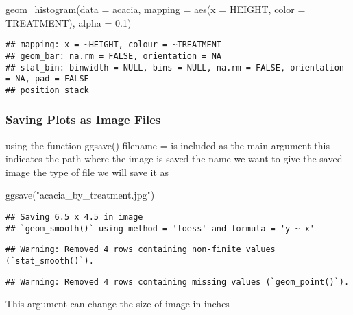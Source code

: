 \documentclass[
]{article}
\newenvironment{Shaded}{\begin{snugshade}}{\end{snugshade}}
\newcommand{\AttributeTok}[1]{\textcolor[rgb]{0.77,0.63,0.00}{#1}}
\newcommand{\FloatTok}[1]{\textcolor[rgb]{0.00,0.00,0.81}{#1}}
\newcommand{\FunctionTok}[1]{\textcolor[rgb]{0.00,0.00,0.00}{#1}}
\newcommand{\NormalTok}[1]{#1}
\newcommand{\StringTok}[1]{\textcolor[rgb]{0.31,0.60,0.02}{#1}}
\begin{document}
\begin{Shaded}
\begin{Highlighting}[]
\FunctionTok{geom\_histogram}\NormalTok{(}\AttributeTok{data =}\NormalTok{ acacia,}
               \AttributeTok{mapping =} \FunctionTok{aes}\NormalTok{(}\AttributeTok{x =}\NormalTok{ HEIGHT, }\AttributeTok{color =}\NormalTok{ TREATMENT), }
               \AttributeTok{alpha =} \FloatTok{0.1}\NormalTok{)}
\end{Highlighting}
\end{Shaded}

\begin{verbatim}
## mapping: x = ~HEIGHT, colour = ~TREATMENT 
## geom_bar: na.rm = FALSE, orientation = NA
## stat_bin: binwidth = NULL, bins = NULL, na.rm = FALSE, orientation = NA, pad = FALSE
## position_stack
\end{verbatim}

\hypertarget{saving-plots-as-image-files}{%
\subsubsection{Saving Plots as Image
Files}\label{saving-plots-as-image-files}}

using the function ggsave() filename = is included as the main argument
this indicates the path where the image is saved the name we want to
give the saved image the type of file we will save it as

\begin{Shaded}
\begin{Highlighting}[]
\FunctionTok{ggsave}\NormalTok{(}\StringTok{"acacia\_by\_treatment.jpg"}\NormalTok{)}
\end{Highlighting}
\end{Shaded}

\begin{verbatim}
## Saving 6.5 x 4.5 in image
## `geom_smooth()` using method = 'loess' and formula = 'y ~ x'
\end{verbatim}

\begin{verbatim}
## Warning: Removed 4 rows containing non-finite values (`stat_smooth()`).
\end{verbatim}

\begin{verbatim}
## Warning: Removed 4 rows containing missing values (`geom_point()`).
\end{verbatim}

This argument can change the size of image in inches
\end{document}
